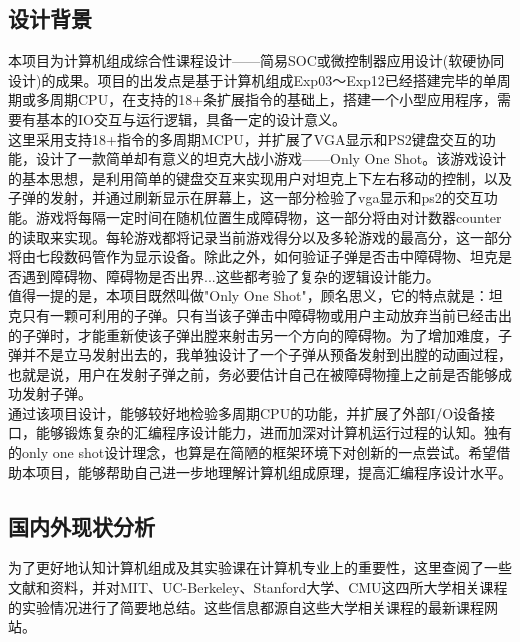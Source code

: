 \subsection{设计背景}
本项目为计算机组成综合性课程设计——简易SOC或微控制器应用设计(软硬协同设计)的成果。项目的出发点是基于计算机组成Exp03～Exp12已经搭建完毕的单周期或多周期CPU，在支持的18+条扩展指令的基础上，搭建一个小型应用程序，需要有基本的IO交互与运行逻辑，具备一定的设计意义。\\

这里采用支持18+指令的多周期MCPU，并扩展了VGA显示和PS2键盘交互的功能，设计了一款简单却有意义的坦克大战小游戏——Only One Shot。该游戏设计的基本思想，是利用简单的键盘交互来实现用户对坦克上下左右移动的控制，以及子弹的发射，并通过刷新显示在屏幕上，这一部分检验了vga显示和ps2的交互功能。游戏将每隔一定时间在随机位置生成障碍物，这一部分将由对计数器counter的读取来实现。每轮游戏都将记录当前游戏得分以及多轮游戏的最高分，这一部分将由七段数码管作为显示设备。除此之外，如何验证子弹是否击中障碍物、坦克是否遇到障碍物、障碍物是否出界...这些都考验了复杂的逻辑设计能力。\\

值得一提的是，本项目既然叫做"Only One Shot"，顾名思义，它的特点就是：坦克只有一颗可利用的子弹。只有当该子弹击中障碍物或用户主动放弃当前已经击出的子弹时，才能重新使该子弹出膛来射击另一个方向的障碍物。为了增加难度，子弹并不是立马发射出去的，我单独设计了一个子弹从预备发射到出膛的动画过程，也就是说，用户在发射子弹之前，务必要估计自己在被障碍物撞上之前是否能够成功发射子弹。\\

通过该项目设计，能够较好地检验多周期CPU的功能，并扩展了外部I/O设备接口，能够锻炼复杂的汇编程序设计能力，进而加深对计算机运行过程的认知。独有的only one shot设计理念，也算是在简陋的框架环境下对创新的一点尝试。希望借助本项目，能够帮助自己进一步地理解计算机组成原理，提高汇编程序设计水平。\\

\subsection{国内外现状分析}

为了更好地认知计算机组成及其实验课在计算机专业上的重要性，这里查阅了一些文献和资料，并对MIT、UC-Berkeley、Stanford大学、CMU这四所大学相关课程的实验情况进行了简要地总结。这些信息都源自这些大学相关课程的最新课程网站。\\

